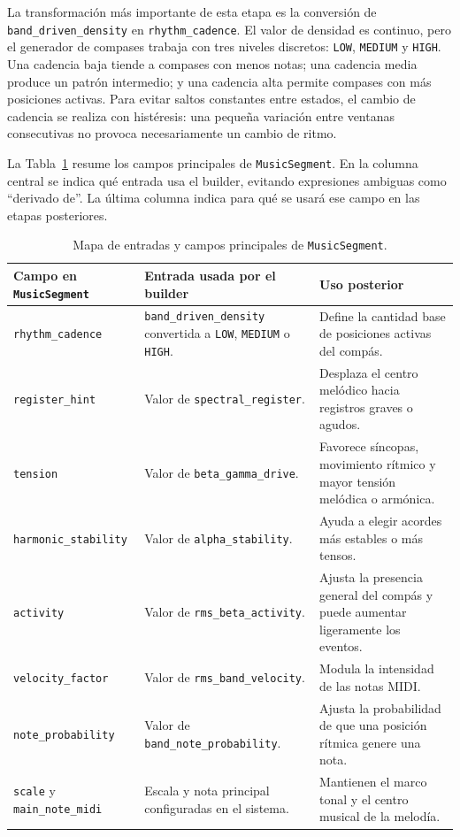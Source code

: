 \documentclass[../main.tex]{subfiles}
\begin{document}
La transformación más importante de esta etapa es la conversión de \texttt{band\_driven\_density} en \texttt{rhythm\_cadence}. El valor de densidad es continuo, pero el generador de compases trabaja con tres niveles discretos: \texttt{LOW}, \texttt{MEDIUM} y \texttt{HIGH}. Una cadencia baja tiende a compases con menos notas; una cadencia media produce un patrón intermedio; y una cadencia alta permite compases con más posiciones activas. Para evitar saltos constantes entre estados, el cambio de cadencia se realiza con histéresis: una pequeña variación entre ventanas consecutivas no provoca necesariamente un cambio de ritmo.

La Tabla~\ref{tab:impl_music_segment_mapeo} resume los campos principales de \texttt{MusicSegment}. En la columna central se indica qué entrada usa el builder, evitando expresiones ambiguas como ``derivado de''. La última columna indica para qué se usará ese campo en las etapas posteriores.

\begin{table}[H]
    \centering
    \caption{Mapa de entradas y campos principales de \texttt{MusicSegment}.}
    \label{tab:impl_music_segment_mapeo}
    \footnotesize
    \setlength{\tabcolsep}{3pt}
    \renewcommand{\arraystretch}{1.10}
    \begin{tabular}{p{}p{}p{}}
        \hline
        \textbf{Campo en \texttt{MusicSegment}} & \textbf{Entrada usada por el builder} & \textbf{Uso posterior} \\
        \hline
        \texttt{rhythm\_cadence} &
        \texttt{band\_driven\_density} convertida a \texttt{LOW}, \texttt{MEDIUM} o \texttt{HIGH}. &
        Define la cantidad base de posiciones activas del compás. \\
        \texttt{register\_hint} &
        Valor de \texttt{spectral\_register}. &
        Desplaza el centro melódico hacia registros graves o agudos. \\
        \texttt{tension} &
        Valor de \texttt{beta\_gamma\_drive}. &
        Favorece síncopas, movimiento rítmico y mayor tensión melódica o armónica. \\
        \texttt{harmonic\_stability} &
        Valor de \texttt{alpha\_stability}. &
        Ayuda a elegir acordes más estables o más tensos. \\
        \texttt{activity} &
        Valor de \texttt{rms\_beta\_activity}. &
        Ajusta la presencia general del compás y puede aumentar ligeramente los eventos. \\
        \texttt{velocity\_factor} &
        Valor de \texttt{rms\_band\_velocity}. &
        Modula la intensidad de las notas MIDI. \\
        \texttt{note\_probability} &
        Valor de \texttt{band\_note\_probability}. &
        Ajusta la probabilidad de que una posición rítmica genere una nota. \\
        \texttt{scale} y \texttt{main\_note\_midi} &
        Escala y nota principal configuradas en el sistema. &
        Mantienen el marco tonal y el centro musical de la melodía. \\
        \hline
    \end{tabular}
\end{table}
\end{document}
